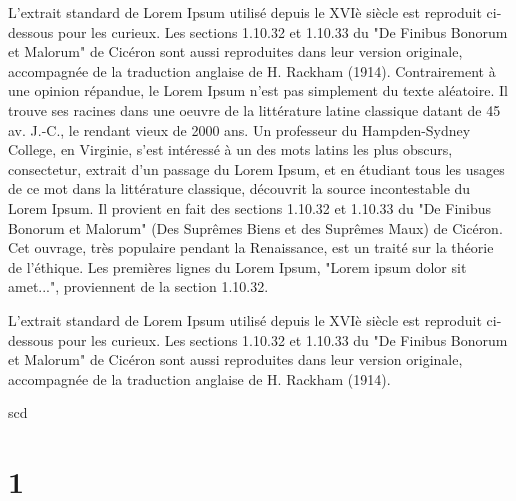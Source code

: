 \documentclass{book}
\begin{document}
L'extrait standard de Lorem Ipsum utilisé depuis le XVIè siècle est reproduit ci-dessous pour les curieux. Les sections 1.10.32 et 1.10.33 du "De Finibus Bonorum et Malorum" de Cicéron sont aussi reproduites dans leur version originale, accompagnée de la traduction anglaise de H. Rackham (1914).
Contrairement à une opinion répandue, le Lorem Ipsum n'est pas simplement du texte aléatoire. Il trouve ses racines dans une oeuvre de la littérature latine classique datant de 45 av. J.-C., le rendant vieux de 2000 ans. Un professeur du Hampden-Sydney College, en Virginie, s'est intéressé à un des mots latins les plus obscurs, consectetur, extrait d'un passage du Lorem Ipsum, et en étudiant tous les usages de ce mot dans la littérature classique, découvrit la source incontestable du Lorem Ipsum. Il provient en fait des sections 1.10.32 et 1.10.33 du "De Finibus Bonorum et Malorum" (Des Suprêmes Biens et des Suprêmes Maux) de Cicéron. Cet ouvrage, très populaire pendant la Renaissance, est un traité sur la théorie de l'éthique. Les premières lignes du Lorem Ipsum, "Lorem ipsum dolor sit amet...", proviennent de la section 1.10.32.

L'extrait standard de Lorem Ipsum utilisé depuis le XVIè siècle est reproduit ci-dessous pour les curieux. Les sections 1.10.32 et 1.10.33 du "De Finibus Bonorum et Malorum" de Cicéron sont aussi reproduites dans leur version originale, accompagnée de la traduction anglaise de H. Rackham (1914).



scd
\pend
\endnumbering

\chapter{1}
\end{document}
